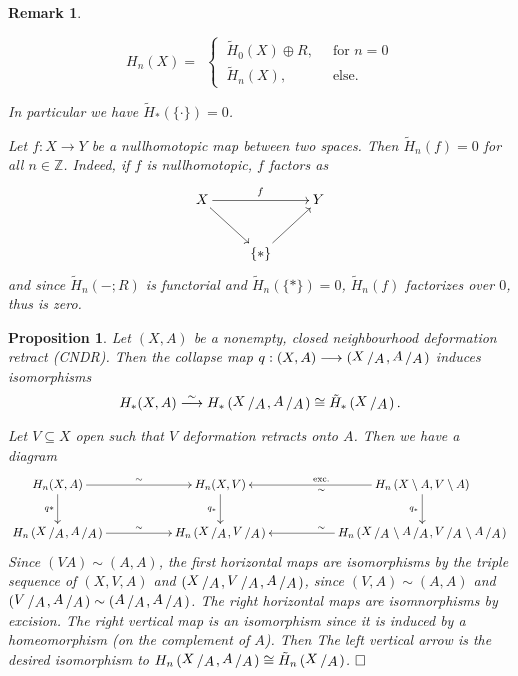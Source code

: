 \documentclass[11pt]{book}
\numberwithin{dummy}{section}
\newtheorem{proposition}[theorem]{Proposition}
\newtheorem{remark}[theorem]{Remark}
\theoremstyle{nonumberbreak}
\newenvironment{pr}[1][]{\ifthenelse{\equal{#1}{}}{\proof}{\proof[#1]}\rm}{\endproof}
\newcommand{\la}{\longrightarrow}
\newcommand{\Z}{\mathbb{Z}}
\newcommand{\slant}[2]{{\raisebox{.1em}{$#1$}\left/\raisebox{-.1em}{$#2$}\right.}}
\begin{document}
\begin{spacing}{1.4}
\begin{remark}
\begin{compactenum}
$$H_n(X) =\ \ \begin{cases} \ \tilde{H}_0(X) \oplus R, & \ \textrm{ for }n=0 \\ \  \tilde{H}_n(X), & \ \textrm{ else. } \end{cases}$$

In particular we have $\tilde{H}_*(\{\cdot\}) = 0$. 

\item Let $f: X \la Y$ be a nullhomotopic map between two spaces. Then $\tilde{H}_n(f)=0$ for all $n \in \Z$. Indeed, if $f$ is nullhomotopic, $f$ factors as
$$
\begin{xy}
\xymatrix{
X \ar[rd] \ar[rr]^f &&Y \\ & \{*\} \ar[ru] & 
}
\end{xy}
$$
and since $\tilde{H}_n(-;R)$ is functorial and $\tilde{H}_n(\{*\})=0$, $\tilde{H}_n(f)$ factorizes over $0$, thus is zero.
\end{compactenum}
\end{remark}



\begin{proposition}
Let $(X,A)$ be a nonempty, closed neighbourhood deformation retract (CNDR). Then the collapse map $q: (X,A) \la \left( \slant{X}{A}, \slant{A}{A} \right)$ induces isomorphisms
$$H_*(X,A) \overset{\sim}{\la} H_*\left( \slant{X}{A}, \slant{A}{A} \right) \cong \tilde{H}_*\left( \slant{X}{A} \right).$$

\begin{pr}
Let $V \subseteq X$ open such that $V$ deformation retracts onto $A$. Then we have a diagram
$$
\begin{xy}
\xymatrix{
H_n(X,A) \ar[rr]^{\sim} \ar[d]_{q*} && H_n(X,V) \ar[d]_{q_*} && H_n \left( X \setminus A, V \setminus A \right) \ar[ll]^{\sim}_{\mathrm{exc.}} \ar[d]_{q_*} \\
H_n\left( \slant{X}{A}, \slant{A}{A} \right) \ar[rr]^{\sim} && H_n \left( \slant{X}{A}, \slant{V}{A} \right) && H_n \left( \slant{X}{A} \setminus \slant{A}{A}, \slant{V}{A} \setminus \slant{A}{A} \right) \ar[ll]_{\sim}
}
\end{xy}
$$
Since $(VA) \sim (A,A)$, the first horizontal maps are isomorphisms by the triple sequence of $(X,V,A)$ and $\left( \slant{X}{A}, \slant{V}{A}, \slant{A}{A} \right)$, since $(V,A) \sim (A,A)$ and $\left( \slant{V}{A}, \slant{A}{A}\right) \sim \left( \slant{A}{A}, \slant{A}{A}\right)$. The right horizontal maps are isomnorphisms by excision. The right vertical map is an isomorphism since it is induced by a homeomorphism (on the complement of $A$). Then The left vertical arrow is the desired isomorphism to $H_n\left( \slant{X}{A}, \slant{A}{A}\right) \cong \tilde{H}_n\left(\slant{X}{A}\right)$. $\hfill \Box$
\end{pr}




\end{proposition}
\end{spacing}
\end{document}
